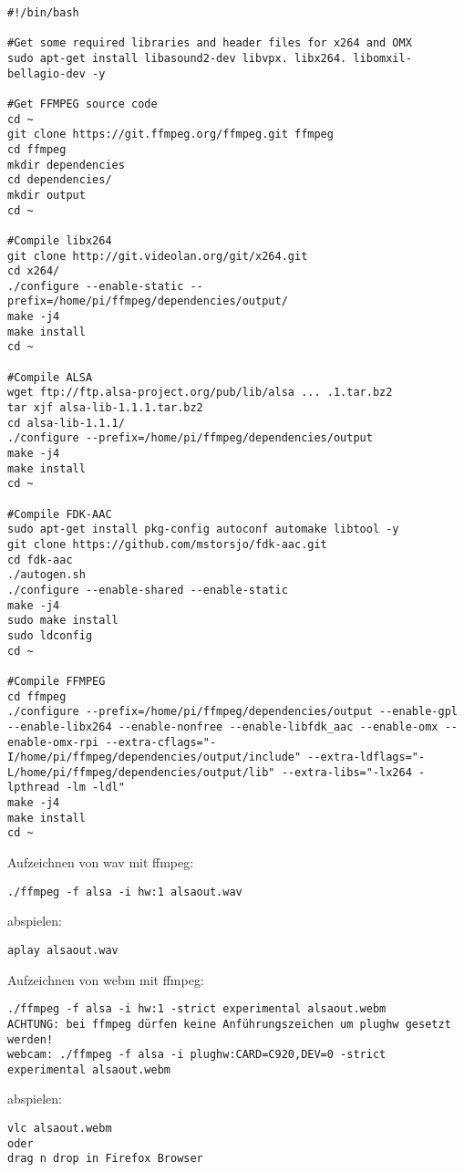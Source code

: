 \begin{verbatim}
#!/bin/bash

#Get some required libraries and header files for x264 and OMX
sudo apt-get install libasound2-dev libvpx. libx264. libomxil-bellagio-dev -y

#Get FFMPEG source code
cd ~
git clone https://git.ffmpeg.org/ffmpeg.git ffmpeg
cd ffmpeg
mkdir dependencies
cd dependencies/
mkdir output
cd ~

#Compile libx264
git clone http://git.videolan.org/git/x264.git
cd x264/
./configure --enable-static --prefix=/home/pi/ffmpeg/dependencies/output/
make -j4
make install
cd ~

#Compile ALSA
wget ftp://ftp.alsa-project.org/pub/lib/alsa ... .1.tar.bz2
tar xjf alsa-lib-1.1.1.tar.bz2
cd alsa-lib-1.1.1/
./configure --prefix=/home/pi/ffmpeg/dependencies/output
make -j4
make install
cd ~

#Compile FDK-AAC
sudo apt-get install pkg-config autoconf automake libtool -y
git clone https://github.com/mstorsjo/fdk-aac.git
cd fdk-aac
./autogen.sh
./configure --enable-shared --enable-static
make -j4
sudo make install
sudo ldconfig
cd ~

#Compile FFMPEG
cd ffmpeg
./configure --prefix=/home/pi/ffmpeg/dependencies/output --enable-gpl --enable-libx264 --enable-nonfree --enable-libfdk_aac --enable-omx --enable-omx-rpi --extra-cflags="-I/home/pi/ffmpeg/dependencies/output/include" --extra-ldflags="-L/home/pi/ffmpeg/dependencies/output/lib" --extra-libs="-lx264 -lpthread -lm -ldl"
make -j4
make install
cd ~

\end{verbatim}	
	
Aufzeichnen von wav mit ffmpeg:
\begin{verbatim}./ffmpeg -f alsa -i hw:1 alsaout.wav \end{verbatim}
abspielen:
\begin{verbatim}aplay alsaout.wav \end{verbatim}
Aufzeichnen von webm mit ffmpeg:
\begin{verbatim}
./ffmpeg -f alsa -i hw:1 -strict experimental alsaout.webm  
ACHTUNG: bei ffmpeg dürfen keine Anführungszeichen um plughw gesetzt werden!
webcam: ./ffmpeg -f alsa -i plughw:CARD=C920,DEV=0 -strict experimental alsaout.webm

\end{verbatim}
abspielen:
\begin{verbatim}
vlc alsaout.webm 
oder
drag n drop in Firefox Browser
\end{verbatim}

